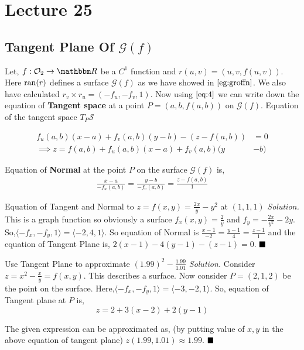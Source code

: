 \documentclass[../Analysis-3]{subfiles}
\begin{document}
\chapter*{Lecture 25} %
\setcounter{chapter}{25} %
\setcounter{section}{0}
\section{Tangent Plane Of $\mathcal{G}(f)$}

Let, $f : \mathcal{O}_2 \to \R$ be a $C^1$ function and $r(u,v) = (u,v,f(u,v))$. Here $\operatorname{ran}(r)$ defines a surface $\mathcal{G}(f)$ as we have showed in $\ref{eg:groffn}$. We also have calculated $r_v\times r_u = (-f_u,-f_v,1)$. Now using $\ref{eq:4}$ we can write down the equation of \textbf{Tangent space} at a point $P = (a,b,f(a,b))$ on $\mathcal{G}(f)$. Equation of the tangent space $T_P \mathcal{S}$

\begin{align}
    f_u(a,b)(x-a) + f_v(a,b)(y-b)-(z-f(a,b))         & = 0 \nonumber     \\
    \implies z = f(a,b) + f_u(a,b)(x-a) + f_v(a,b)(y & -b) \label{eq:tp}
\end{align}

Equation of \textbf{Normal} at the point $P$ on the surface $\mathcal{G}(f)$ is,
\begin{align}\label{eq:np}
    \frac{x-a}{-f_u(a,b)} = \frac{y-b}{-f_v(a,b)} = \frac{z-f(a,b)}{1}
\end{align}

\begin{Eg}{Equation of Tangent and Normal to $z = f(x,y) = \frac{2x}{y}-y^2$ at $(1,1,1)$}{}
    \textit{Solution.} This is a graph function so obviously a surface $f_x(x,y) = \frac{2}{y}$ and $f_y = -\frac{2x}{y^2} -2y$. So,$\langle -f_x,- f_y,1 \rangle = \langle -2,4,1\rangle$. So equation of Normal
    is $\frac{x-1}{-2}=\frac{y-1}{4}=\frac{z-1}{1}$ and the equation of Tangent Plane is,
    $ 2(x-1)-4(y-1) -(z-1) = 0$. $\hfill \blacksquare $
\end{Eg}
\begin{Eg}{Use Tangent Plane to approximate $(1.99)^2 - \frac{1.99}{1.01}$}{}
    \textit{Solution.} Consider $z = x^2 - \frac{x}{y} = f(x,y)$. This describes a surface. Now consider $P=(2,1,2)$ be the point on the surface. Here,$\langle -f_x,- f_y,1 \rangle = \langle -3,-2,1\rangle$. So, equation of Tangent plane at $P$ is, \[z = 2 +3(x-2) +2(y-1)\]

    The given expression can be approximated as, (by putting value of $x,y$ in the above equation of tangent plane) $z(1.99,1.01) \approx 1.99$. $\hfill \blacksquare$
\end{Eg}
\end{document}

